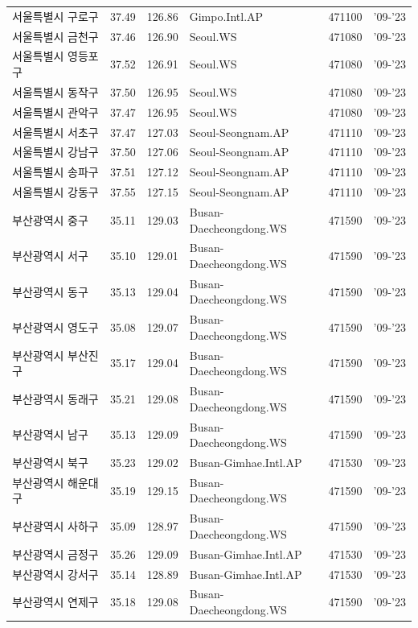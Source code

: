 \begin{longtable}{lcclcc}
  서울특별시 구로구 & 37.49 & 126.86 & Gimpo.Intl.AP & 471100 & '09-'23 \\
  서울특별시 금천구 & 37.46 & 126.90 & Seoul.WS & 471080 & '09-'23 \\
  서울특별시 영등포구 & 37.52 & 126.91 & Seoul.WS & 471080 & '09-'23 \\
  서울특별시 동작구 & 37.50 & 126.95 & Seoul.WS & 471080 & '09-'23 \\
  서울특별시 관악구 & 37.47 & 126.95 & Seoul.WS & 471080 & '09-'23 \\
  서울특별시 서초구 & 37.47 & 127.03 & Seoul-Seongnam.AP & 471110 & '09-'23 \\
  서울특별시 강남구 & 37.50 & 127.06 & Seoul-Seongnam.AP & 471110 & '09-'23 \\
  서울특별시 송파구 & 37.51 & 127.12 & Seoul-Seongnam.AP & 471110 & '09-'23 \\
  서울특별시 강동구 & 37.55 & 127.15 & Seoul-Seongnam.AP & 471110 & '09-'23 \\
  부산광역시 중구 & 35.11 & 129.03 & Busan-Daecheongdong.WS & 471590 & '09-'23 \\
  부산광역시 서구 & 35.10 & 129.01 & Busan-Daecheongdong.WS & 471590 & '09-'23 \\
  부산광역시 동구 & 35.13 & 129.04 & Busan-Daecheongdong.WS & 471590 & '09-'23 \\
  부산광역시 영도구 & 35.08 & 129.07 & Busan-Daecheongdong.WS & 471590 & '09-'23 \\
  부산광역시 부산진구 & 35.17 & 129.04 & Busan-Daecheongdong.WS & 471590 & '09-'23 \\
  부산광역시 동래구 & 35.21 & 129.08 & Busan-Daecheongdong.WS & 471590 & '09-'23 \\
  부산광역시 남구 & 35.13 & 129.09 & Busan-Daecheongdong.WS & 471590 & '09-'23 \\
  부산광역시 북구 & 35.23 & 129.02 & Busan-Gimhae.Intl.AP & 471530 & '09-'23 \\
  부산광역시 해운대구 & 35.19 & 129.15 & Busan-Daecheongdong.WS & 471590 & '09-'23 \\
  부산광역시 사하구 & 35.09 & 128.97 & Busan-Daecheongdong.WS & 471590 & '09-'23 \\
  부산광역시 금정구 & 35.26 & 129.09 & Busan-Gimhae.Intl.AP & 471530 & '09-'23 \\
  부산광역시 강서구 & 35.14 & 128.89 & Busan-Gimhae.Intl.AP & 471530 & '09-'23 \\
  부산광역시 연제구 & 35.18 & 129.08 & Busan-Daecheongdong.WS & 471590 & '09-'23 \\

\end{longtable}
